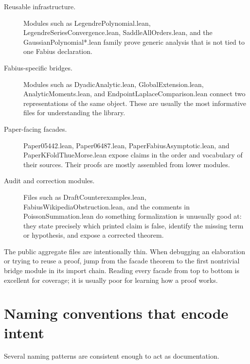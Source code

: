 \documentclass[11pt,a4paper,openany]{book}
\def\module#1{#1.lean}
\newcommand{\module}[1]{\nolinkurl{#1.lean}}
\begin{document}
\begin{description}
\item[Reusable infrastructure.]
Modules such as \module{LegendrePolynomial},
\module{LegendreSeriesConvergence}, \module{SaddleAllOrders}, and the
\module{GaussianPolynomial*} family prove generic analysis that is not tied to
one Fabius declaration.

\item[Fabius-specific bridges.]
Modules such as \module{DyadicAnalytic}, \module{GlobalExtension},
\module{AnalyticMoments}, and \module{EndpointLaplaceComparison} connect two
representations of the same object.  These are usually the most informative
files for understanding the library.

\item[Paper-facing facades.]
\module{Paper05442}, \module{Paper06487}, \module{PaperFabiusAsymptotic}, and
\module{PaperKFoldThueMorse} expose claims in the order and vocabulary of their
sources.  Their proofs are mostly assembled from lower modules.

\item[Audit and correction modules.]
Files such as \module{DraftCounterexamples},
\module{FabiusWikipediaObstruction}, and the comments in
\module{PoissonSummation} do something formalization is unusually good at:
they state precisely which printed claim is false, identify the missing term
or hypothesis, and expose a corrected theorem.
\end{description}

\begin{engineering}
The public aggregate files are intentionally thin.  When debugging an
elaboration or trying to reuse a proof, jump from the facade theorem to the
first nontrivial bridge module in its import chain.  Reading every facade from
top to bottom is excellent for coverage; it is usually poor for learning how a
proof works.
\end{engineering}

\section{Naming conventions that encode intent}
Several naming patterns are consistent enough to act as documentation.
\end{document}
